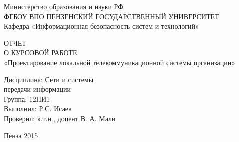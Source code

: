 \begin{titlepage}
  
\begin{centering}
  Министерство образования и науки РФ\\
  ФГБОУ ВПО ПЕНЗЕНСКИЙ ГОСУДАРСТВЕННЫЙ УНИВЕРСИТЕТ\\
  Кафедра «Информационная безопасность систем и технологий»\\
  
  \vfill

  ОТЧЕТ\\
  О КУРСОВОЙ РАБОТЕ\\
  «Проектирование локальной телекоммуникационной системы организации»\\
\end{centering}

\vfill

\begin{flushleft}
  \hspace{9cm}Дисциплина: Сети и системы\\
  \hspace{9cm}передачи информации\\
  \hspace{9cm}Группа: 12ПИ1\\
  \hspace{9cm}Выполнил: Р.С. Исаев\\
  \hspace{9cm}Проверил: к.т.н., доцент В. А. Мали\\
\end{flushleft}

\vfill

\centerline{Пенза 2015}
\end{titlepage}
